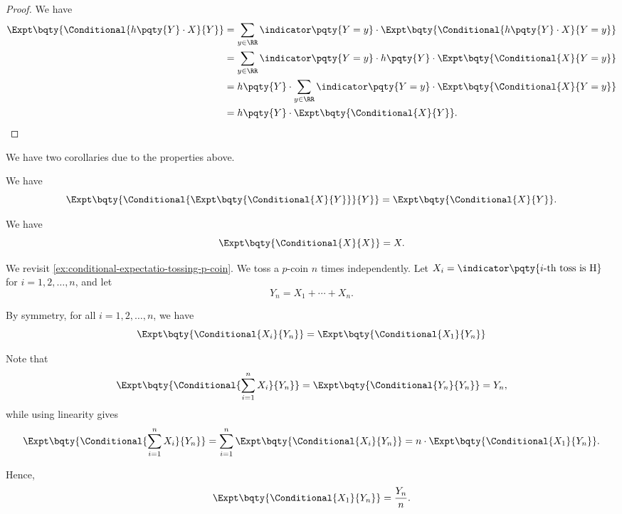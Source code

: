 \begin{proof}
    We have
    \begin{align*}
        \Expt\bqty{\Conditional{h\pqty{Y} \cdot X}{Y}} &= \sum_{y \in \RR} \indicator\pqty{Y = y} \cdot \Expt\bqty{\Conditional{h\pqty{Y} \cdot X}{Y = y}} \\
        &= \sum_{y \in \RR} \indicator\pqty{Y = y} \cdot h\pqty{Y} \cdot \Expt\bqty{\Conditional{X}{Y = y}} \\
        &= h\pqty{Y} \cdot \sum_{y \in \RR} \indicator\pqty{Y = y} \cdot \Expt\bqty{\Conditional{X}{Y = y}} \\
        &= h\pqty{Y} \cdot \Expt\bqty{\Conditional{X}{Y}}.
    \end{align*}
\end{proof}

We have two corollaries due to the properties above.

\begin{corollary}
    \label{cor:conditional-expecation-upon-same-condition}%
    We have
    \[
        \Expt\bqty{\Conditional{\Expt\bqty{\Conditional{X}{Y}}}{Y}} = \Expt\bqty{\Conditional{X}{Y}}.
    \]
\end{corollary}

\begin{corollary}
    \label{cor:conditional-expectation-upon-itself}%
    We have
    \[
        \Expt\bqty{\Conditional{X}{X}} = X.
    \]    
\end{corollary}

\begin{example}
    \label{ex:conditional-expectatio-tossing-p-coin-revisited}%
    We revisit \autoref{ex:conditional-expectatio-tossing-p-coin}. We toss a \(p\)-coin \(n\) times independently. Let \(X_i = \indicator\pqty{i\text{-th toss is H}}\) for \(i = 1, 2, \ldots, n\), and let
    \[
        Y_n = X_1 + \cdots + X_n.
    \]

    By symmetry, for all \(i = 1, 2, \ldots, n\), we have
    \[
        \Expt\bqty{\Conditional{X_i}{Y_n}} = \Expt\bqty{\Conditional{X_1}{Y_n}}
    \]

    Note that
    \[
        \Expt\bqty{\Conditional{\sum_{i = 1}^{n} X_i}{Y_n}} = \Expt\bqty{\Conditional{Y_n}{Y_n}} = Y_n,
    \]
    while using linearity gives
    \[
        \Expt\bqty{\Conditional{\sum_{i = 1}^{n} X_i}{Y_n}} = \sum_{i = 1}^{n} \Expt\bqty{\Conditional{X_i}{Y_n}} = n \cdot \Expt\bqty{\Conditional{X_1}{Y_n}}.
    \]

    Hence,
    \[
        \Expt\bqty{\Conditional{X_1}{Y_n}} = \frac{Y_n}{n}.
    \]
\end{example}